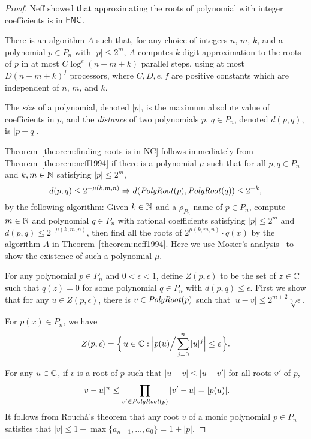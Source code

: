 \documentclass[envcountsame,orivec,oribibl]{llncs}
\begin{document}
\begin{proof}
Neff showed that approximating the roots of polynomial with integer coefficients
is in $\mathsf{FNC}$.
\begin{theorem}
\label{theorem:neff1994}
There is an algorithm $A$ such that,
for any choice of integers $n$, $m$, $k$, and a polynomial $p \in P_n$
with $|p| \le 2^m$,
$A$ computes $k$-digit approximation to the roots of $p$ 
in at most $C \log^e(n + m + k)$ parallel steps, 
using at most $D(n + m + k)^f$ processors, where $C, D, e, f$ are positive
constants which are independent of $n$, $m$, and $k$.
\end{theorem}
The \emph{size} of a polynomial, denoted $|p|$, is the maximum absolute value
 of coefficients in $p$, and the \emph{distance} of
two polynomials $p$, $q \in P_n$, denoted $d(p, q)$, is $|p-q|$.

Theorem~\ref{theorem:finding-roots-is-in-NC} follows immediately from
Theorem~\ref{theorem:neff1994}
if there is a polynomial $\mu$ such that for all $p, q \in P_n$ and
$k, m \in \mathbb N$ satisfying $|p| \le 2^m$,
\begin{equation}
  d(p, q) \le 2^{-\mu(k, m, n)} \Rightarrow d(\mathit{PolyRoot}(p), \mathit{PolyRoot}(q)) \le 2^{-k},
\end{equation}
by the following algorithm:
Given $k \in \mathbb N$ and a $\rho_{P_n}$-name of $p \in P_n$, 
compute $m \in \mathbb N$ and polynomial $q \in {P_n}$ with rational coefficients
satisfying $|p| \le 2^m$ and $d(p, q) \le 2^{-\mu(k, m, n)}$,
then find all the roots of $2^{\mu(k, m, n)} \cdot q(x)$ by the algorithm $A$ 
in Theorem~\ref{theorem:neff1994}.
Here we use Mosier's analysis~\cite{mosier1986root} 
to show the existence of such a polynomial $\mu$.

For any polynomial $p \in P_n$ and $0 < \epsilon < 1$, 
define $Z(p, \epsilon)$ to be the set of $z \in \mathbb C$
such that $q(z) = 0$ 
for some polynomial $q \in P_n$ with $d(p, q) \le \epsilon$. 
First we show that for any $u \in Z(p, \epsilon)$, there is $v \in \mathit{PolyRoot}(p)$ such that $|u - v| \le 2^{m+2}\sqrt[n]{\epsilon}$.
\begin{theorem} 
\label{theorem: root neighborhoods 1}
 For $p(x) \in P_n$, we have
 \begin{equation}
  Z(p, \epsilon) = \Bigl\{\, u \in \mathbb C : \Bigl| p(u) \!\!\Bigm/\! \sum _{j=0} ^n |u|^j \Bigr| \le \epsilon \,\Bigr\}. 
 \end{equation}
\end{theorem}
For any $u \in \mathbb C$, if $v$ is a root of $p$ such that 
$|u - v| \le |u - v'|$ for all roots $v'$ of $p$,
\begin{equation}
 |v - u|^n
 \le \prod_{v' \in \mathit{PolyRoot}(p)} |v' - u|
 = |p(u)|.
\end{equation}
It follows from  Rouch\'a's theorem that
any root $v$ of a monic polynomial $p \in P_n$ satisfies that
$|v| \le 1 + \max\{a_{n-1}, \dots, a_0\} = 1 + |p|$.


\end{proof}
\end{document}
